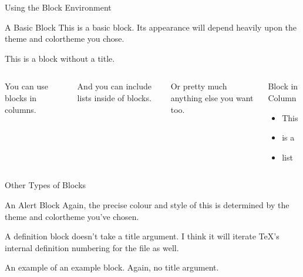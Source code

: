 \documentclass{beamer}
\begin{document}
\begin{frame}[plain]							%
	\tableofcontents[current]					%
\end{frame}


\begin{frame}{Using the Block Environment}
	
	\begin{block}{A Basic Block}
		This is a basic block. Its appearance will depend heavily upon the theme and colortheme you chose.
	\end{block}
	
	\begin{block}{}							%
		This is a block without a title.
	\end{block}
	
	\vfill
	
	\begin{columns}[c]
	You can use \alert{blocks} in columns. 
	
	\medskip
	
	And you can include lists inside of blocks.
	
	\medskip
	
	Or pretty much anything else you want too.
	
	\begin{block}{Block in Column}
		\begin{itemize}
			\item This
			\item is a
			\item list
		\end{itemize}
	\end{block}
	\end{columns}
	
\end{frame}


\begin{frame}{Other Types of Blocks}

	\begin{alertblock}{An Alert Block}				%
		Again, the precise colour and style of this is determined by the theme and colortheme you've chosen.	
	\end{alertblock}
	
	\begin{definition}
		A definition block doesn't take a title argument. I think it will iterate TeX's internal definition numbering for the file as well.
	\end{definition}
	
	\begin{example}
		An example of an example block. Again, no title argument.
	\end{example}
	
\end{frame}
\end{document}
